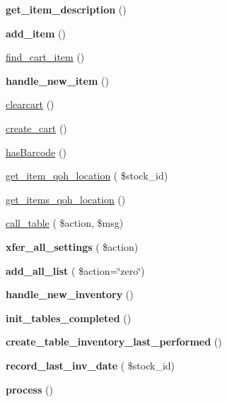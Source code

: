 \begin{DoxyCompactItemize}
{\bfseries get\+\_\+item\+\_\+description} ()
\item 
\hypertarget{class_inventory_ad141ddfa4b1b812f60ef7ad0ef8d391f}{}\label{class_inventory_ad141ddfa4b1b812f60ef7ad0ef8d391f} 
{\bfseries add\+\_\+item} ()
\item 
\hyperlink{class_inventory_a20a38a02a619c23ac051bef0f804b533}{find\+\_\+cart\+\_\+item} ()
\item 
\hypertarget{class_inventory_a4bd02c483dcc9f4f76ccb86a4aee44f4}{}\label{class_inventory_a4bd02c483dcc9f4f76ccb86a4aee44f4} 
{\bfseries handle\+\_\+new\+\_\+item} ()
\item 
\hyperlink{class_inventory_a2ff0a0bf19271240f31d948ac2373141}{clearcart} ()
\item 
\hyperlink{class_inventory_a6fb9d26bbc7d5385e77dd2fd01da307b}{create\+\_\+cart} ()
\item 
\hyperlink{class_inventory_a5a32d543b372a64b4def7948d4582c9b}{has\+Barcode} ()
\item 
\hyperlink{class_inventory_ab93ab1de4e3622b63b07a3ec17bb5753}{get\+\_\+item\+\_\+qoh\+\_\+location} ( \$stock\+\_\+id)
\item 
\hyperlink{class_inventory_abe1f31716dc97f457dc66411526cfcc6}{get\+\_\+items\+\_\+qoh\+\_\+location} ()
\item 
\hyperlink{class_inventory_abcdb59c12133ade607ed4ef6d80bec94}{call\+\_\+table} ( \$action, \$msg)
\item 
\hypertarget{class_inventory_a5980667d55e7f4df41ee1ca8c6e4e1f7}{}\label{class_inventory_a5980667d55e7f4df41ee1ca8c6e4e1f7} 
{\bfseries xfer\+\_\+all\+\_\+settings} ( \$action)
\item 
\hypertarget{class_inventory_a9f10a2dacd1fa4e3b82c7d62f451bb4b}{}\label{class_inventory_a9f10a2dacd1fa4e3b82c7d62f451bb4b} 
{\bfseries add\+\_\+all\+\_\+list} ( \$action=\char`\"{}zero\char`\"{})
\item 
\hypertarget{class_inventory_aa794599f6f24788a4eea4343ecd90cdb}{}\label{class_inventory_aa794599f6f24788a4eea4343ecd90cdb} 
{\bfseries handle\+\_\+new\+\_\+inventory} ()
\item 
\hypertarget{class_inventory_a27f4d6058f0ed5decaaabbec1408f39e}{}\label{class_inventory_a27f4d6058f0ed5decaaabbec1408f39e} 
{\bfseries init\+\_\+tables\+\_\+completed} ()
\item 
\hypertarget{class_inventory_af8d9a21653be97fe48c954893313733b}{}\label{class_inventory_af8d9a21653be97fe48c954893313733b} 
{\bfseries create\+\_\+table\+\_\+inventory\+\_\+last\+\_\+performed} ()
\item 
\hypertarget{class_inventory_abac339a921acc7633bad02779bff228b}{}\label{class_inventory_abac339a921acc7633bad02779bff228b} 
{\bfseries record\+\_\+last\+\_\+inv\+\_\+date} ( \$stock\+\_\+id)
\item 
\hypertarget{class_inventory_abbef2528107ec0d7d4bb1a0c4dd2ada4}{}\label{class_inventory_abbef2528107ec0d7d4bb1a0c4dd2ada4} 
{\bfseries process} ()
\end{DoxyCompactItemize}
